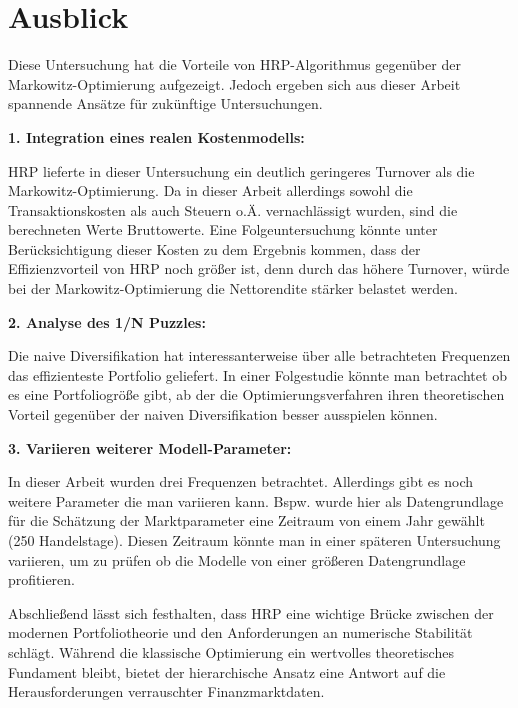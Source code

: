 \documentclass[parskip=half]{scrartcl}
\begin{document}
	\clearpage
	
	\section{Ausblick}
	
	Diese Untersuchung hat die Vorteile von HRP-Algorithmus gegenüber der Markowitz-Optimierung aufgezeigt. Jedoch ergeben sich aus dieser Arbeit spannende Ansätze für zukünftige Untersuchungen.
	
	\textbf{1. Integration eines realen Kostenmodells:}
	
	HRP lieferte in dieser Untersuchung ein deutlich geringeres Turnover als die Markowitz-Optimierung. Da in dieser Arbeit allerdings sowohl die Transaktionskosten als auch Steuern o.Ä. vernachlässigt wurden, sind die berechneten Werte Bruttowerte. Eine Folgeuntersuchung könnte unter Berücksichtigung dieser Kosten zu dem Ergebnis kommen, dass der Effizienzvorteil von HRP noch größer ist, denn durch das höhere Turnover, würde bei der Markowitz-Optimierung die Nettorendite stärker belastet werden.
	
	\textbf{2. Analyse des 1/N Puzzles:}
	
	Die naive Diversifikation hat interessanterweise über alle betrachteten Frequenzen das effizienteste Portfolio geliefert. In einer Folgestudie könnte man betrachtet ob es eine Portfoliogröße gibt, ab der die Optimierungsverfahren ihren theoretischen Vorteil gegenüber der naiven Diversifikation besser ausspielen können. 
	
	\textbf{3. Variieren weiterer Modell-Parameter:}
	
	In dieser Arbeit wurden drei Frequenzen betrachtet. Allerdings gibt es noch weitere Parameter die man variieren kann. Bspw. wurde hier als Datengrundlage für die Schätzung der Marktparameter eine Zeitraum von einem Jahr gewählt (250 Handelstage). Diesen Zeitraum könnte man in einer späteren Untersuchung variieren, um zu prüfen ob die Modelle von einer größeren Datengrundlage profitieren.
	
	Abschließend lässt sich festhalten, dass HRP eine wichtige Brücke zwischen der modernen Portfoliotheorie und den Anforderungen an numerische Stabilität schlägt. Während die klassische Optimierung ein wertvolles theoretisches Fundament bleibt, bietet der hierarchische Ansatz eine Antwort auf die Herausforderungen verrauschter Finanzmarktdaten.
	
	\clearpage
	
	\printbibliography[title={Literaturverzeichnis}]
	\clearpage
	
\end{document}
